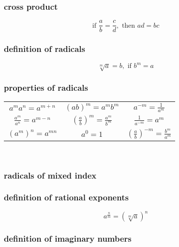 \documentclass[a4paper,12pt]{article}
\begin{document}
\subsubsection{cross product}

\[ \text{if } \frac{a}{b} = \frac{c}{d}, \text{ then } ad = bc \]

\subsubsection{definition of radicals}

\[ \sqrt[m]{a} = b, \text{ if } b^{m} = a \]

\subsubsection{properties of radicals}

\begin{center}
    \begin{tabular}{*{3}c}
        \( a^{m} a^{n} = a^{m+n} \) & \(  (ab)^{m} = a^{m} b^{m} \) & \( a^{-m}
        = \frac{1}{a^{m}} \) \\[10pt]
        \( \frac{a^{m}}{a^{n}} = a^{m-n} \) & \( \displaystyle{
            \left(\frac{a}{b}\right)^{m} } =
        \frac{a^{m}}{b^{m}} \) & \( \frac{1}{a^{-m}} = a^{m} \) \\[10pt]
        \( \left(a^{m}\right)^{n} = a^{mn} \) & \( a^{0} = 1 \) & \(  
        \left(\frac{a}{b}\right)^{-m} = \frac{b^{m}}{a^{m}} \)
    \end{tabular}\\[1cm]
\end{center}
\begin{center}
\end{center}

\subsubsection{radicals of mixed index}

\subsubsection{definition of rational exponents}

\[ a^{\frac{n}{m}}=\left(\sqrt[m]{a}\right)^{n} \]

\subsubsection{definition of imaginary numbers}
\end{document}
